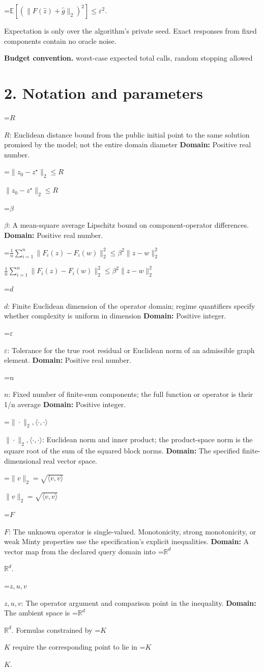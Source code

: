 \documentclass[10pt,a4paper]{article}
\newcommand{\AtlasMath}[1]{\par\begingroup\centering\setbox0=\hbox{$\displaystyle #1$}\ifdim\wd0>1.4\linewidth\typeout{ATLAS WIDE FORMULA: \the\wd0}\fi\ifdim\wd0>\linewidth\resizebox{\linewidth}{!}{\box0}\else\box0\fi\par\endgroup}
\newcommand{\AtlasInlineMath}[1]{\begingroup\setbox0=\hbox{$#1$}\ifdim\wd0>.4\linewidth\endgroup\AtlasMath{#1}\else\endgroup$#1$\fi}
\begin{document}
\AtlasMath{\mathbb{E}\!\left[\left(\|F(\widehat{z})+\widehat{g}\|_2\right)^2\right]\le\varepsilon^2.}


Expectation is only over the algorithm's private seed. Exact responses from fixed components contain no oracle noise.

\textbf{Budget convention.} worst-case expected total calls, random stopping allowed

\section{2. Notation and parameters}
\AtlasInlineMath{R}: Euclidean distance bound from the public initial point to the same solution promised by the model; not the entire domain diameter \textbf{Domain:} Positive real number.

\AtlasInlineMath{\|z_0-z^\star\|_2\le R}

\AtlasInlineMath{\beta}: A mean-square average Lipschitz bound on component-operator differences. \textbf{Domain:} Positive real number.

\AtlasInlineMath{\frac1n\sum_{i=1}^n\|F_i(z)-F_i(w)\|_2^2\le\beta^2\|z-w\|_2^2}

\AtlasInlineMath{d}: Finite Euclidean dimension of the operator domain; regime quantifiers specify whether complexity is uniform in dimension \textbf{Domain:} Positive integer.

\AtlasInlineMath{\varepsilon}: Tolerance for the true root residual or Euclidean norm of an admissible graph element. \textbf{Domain:} Positive real number.

\AtlasInlineMath{n}: Fixed number of finite-sum components; the full function or operator is their 1/n average \textbf{Domain:} Positive integer.

\AtlasInlineMath{\|\cdot\|_2,\langle\cdot,\cdot\rangle}: Euclidean norm and inner product; the product-space norm is the square root of the sum of the squared block norms. \textbf{Domain:} The specified finite-dimensional real vector space.

\AtlasInlineMath{\|v\|_2=\sqrt{\langle v,v\rangle}}

\AtlasInlineMath{F}: The unknown operator is single-valued. Monotonicity, strong monotonicity, or weak Minty properties use the specification’s explicit inequalities. \textbf{Domain:} A vector map from the declared query domain into \AtlasInlineMath{\mathbb R^d}.

\AtlasInlineMath{z,u,v}: The operator argument and comparison point in the inequality. \textbf{Domain:} The ambient space is \AtlasInlineMath{\mathbb R^d}. Formulas constrained by \AtlasInlineMath{K} require the corresponding point to lie in \AtlasInlineMath{K}.
\end{document}
